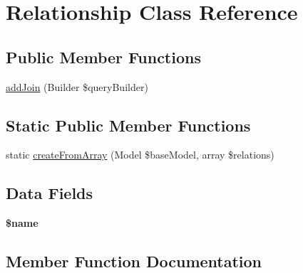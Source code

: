\hypertarget{classhamburgscleanest_1_1_data_tables_1_1_models_1_1_relationship}{}\section{Relationship Class Reference}
\label{classhamburgscleanest_1_1_data_tables_1_1_models_1_1_relationship}
\subsection*{Public Member Functions}
\begin{DoxyCompactItemize}
\item 
\hyperlink{classhamburgscleanest_1_1_data_tables_1_1_models_1_1_relationship_a665939929902fc80cd71734f8b991e54}{add\+Join} (Builder \$query\+Builder)
\end{DoxyCompactItemize}
\subsection*{Static Public Member Functions}
\begin{DoxyCompactItemize}
\item 
static \hyperlink{classhamburgscleanest_1_1_data_tables_1_1_models_1_1_relationship_a84bb3fec988085ea8b74b62e9fabd4c1}{create\+From\+Array} (Model \$base\+Model, array \$relations)
\end{DoxyCompactItemize}
\subsection*{Data Fields}
\begin{DoxyCompactItemize}
\item 
\mbox{\label{classhamburgscleanest_1_1_data_tables_1_1_models_1_1_relationship_ab2fc40d43824ea3e1ce5d86dee0d763b}} 
{\bfseries \$name}
\end{DoxyCompactItemize}


\subsection{Member Function Documentation}
\mbox{\label{classhamburgscleanest_1_1_data_tables_1_1_models_1_1_relationship_a665939929902fc80cd71734f8b991e54}} 
